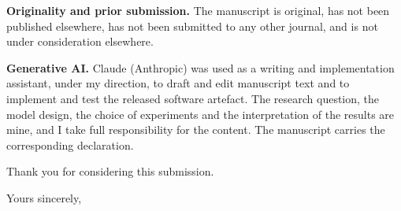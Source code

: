\documentclass[11pt,a4paper]{article}
\begin{document}
\vspace{0.3cm}

\noindent\textbf{Originality and prior submission.} The manuscript is original,
has not been published elsewhere, has not been submitted to any other journal,
and is not under consideration elsewhere.

\vspace{0.3cm}

\noindent\textbf{Generative AI.} Claude (Anthropic) was used as a writing and
implementation assistant, under my direction, to draft and edit manuscript text
and to implement and test the released software artefact. The research question,
the model design, the choice of experiments and the interpretation of the
results are mine, and I take full responsibility for the content. The manuscript
carries the corresponding declaration.


\vspace{0.6cm}

\noindent Thank you for considering this submission.

\vspace{0.6cm}

\noindent Yours sincerely,\\
\capmauthor
\end{document}
